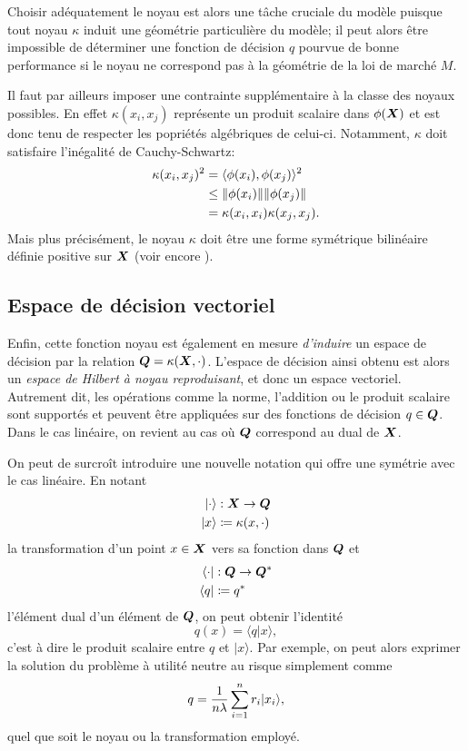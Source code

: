 Choisir adéquatement le noyau est alors une tâche cruciale du modèle puisque tout noyau
$\kappa$ induit une géométrie particulière du modèle; il peut alors être impossible de
déterminer une fonction de décision $q$ pourvue de bonne performance si le noyau ne
correspond pas à la géométrie de la loi de marché $M$.

Il faut par ailleurs imposer une contrainte supplémentaire à la classe des noyaux
possibles. En effet $\kappa(x_i,x_j)$ représente un produit scalaire dans $\phi(\bm{X})$ et est donc
tenu de respecter les popriétés algébriques de celui-ci. Notamment, $\kappa$ doit satisfaire
l'inégalité de Cauchy-Schwartz:
\begin{align}
  \kappa(x_i,x_j)^2 &= \langle\phi(x_i),\phi(x_j)\rangle^2\\
               &\leq \|\phi(x_i)\|\|\phi(x_j)\|\\
               &= \kappa(x_i,x_i)\kappa(x_j,x_j).
\end{align}
Mais plus précisément, le noyau $\kappa$ doit être une forme symétrique bilinéaire définie
positive sur $\bm{X}$ (voir encore \cite{mohri2012foundations,scholkopf2001learning}).




\subsection{Espace de décision vectoriel}


Enfin, cette fonction noyau est également en mesure \textit{d'induire} un espace de
décision par la relation $\bm Q = \kappa(\bm{X},\cdot)$. L'espace de décision ainsi obtenu est alors un
\textit{espace de Hilbert à noyau reproduisant}, et donc un espace vectoriel. Autrement
dit, les opérations comme la norme, l'addition ou le produit scalaire sont supportés et
peuvent être appliquées sur des fonctions de décision $q \in \bm Q$. Dans le cas linéaire, on
revient au cas où $\bm Q$ correspond au dual de $\bm{X}$. 

On peut de surcroît introduire une nouvelle notation qui offre une symétrie avec le cas
linéaire. En notant
\begin{align}
  |\cdot\rangle&:\bm{X} \to \bm Q \\ 
|x\rangle &\coloneqq \kappa(x,\cdot)
\end{align}
la transformation d'un point $x\in\bm{X}$ vers sa fonction dans $\bm Q$ et  
\begin{align}
  \langle\cdot|&:\bm Q \to \bm Q^*\\
  \langle q| &\coloneqq q^*
\end{align}
l'élément dual d'un élément de $\bm Q$, on peut obtenir l'identité
\begin{equation}
  q(x) = \langle q|x \rangle,
\end{equation}
c'est à dire le produit scalaire entre $q$ et $|x\rangle$. Par exemple, on peut alors exprimer
la solution du problème à utilité neutre au risque simplement comme
\begin{equation}
  q = \frac{1}{n\lambda}\sum_{i=1}^n r_i|x_i\rangle,
\end{equation}
quel que soit le noyau ou la transformation employé.


